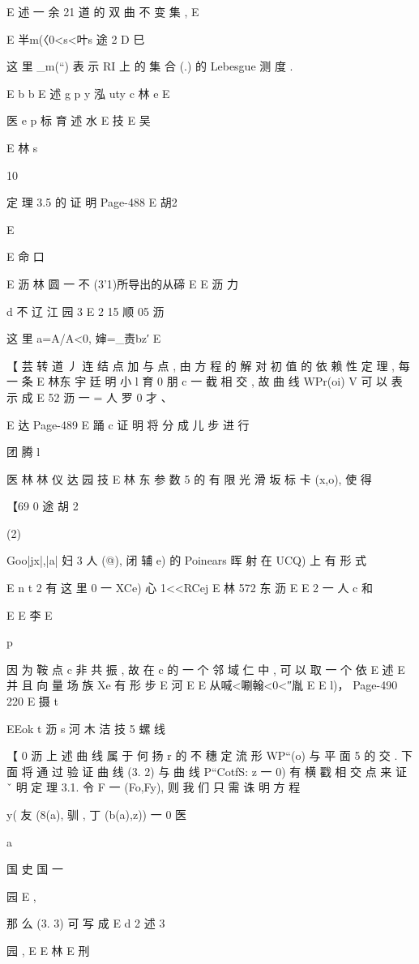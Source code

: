 {{{{E 述 一 余 21
道 的 双 曲 不 变 集 } ,
E

E 半m(〈0<s<叶s 途 2
D 巳

这 里 _m(“) 表 示 RI 上 的 集 合 (.) 的 Lebesgue 测 度 .

E b b
E 述 g p y 泓
uty c 林 e
E

医 e p 标 育 述 水 E 技
E 吴

E 林 s

10

定 理 3.5 的 证 明
Page-488
E 胡2

E

E 命 口

E 沥 林 圆 一 不
(3'1)所导出的从碲 E
E 沥 力

d 不 辽 江 园 3
E 2 15 顺 05 沥

这 里 a=A/A<0, 婶=_责bz′ E

【 芸
转 道 丿 连 结 点 加 与 点 , 由 方 程 的 解 对 初 值 的 依 赖 性 定 理 , 每 一 条
E 林东
宇 廷 明 小 l 育 0 朋
c 一
截 相 交 , 故 曲 线 WPr(oi) V 可 以 表 示 成
E 52 沥 一 = 人 罗 0 才 、

E 达
Page-489
E 踊 c
证 明 将 分 成 儿 步 进 行

团 腾 l

医 林 林 仪 达 园 技
E 林 东
参 数 5 的 有 限 光 滑 坂 标 卡 (x,o), 使 得

【69 0 途 胡 2

(2) {Goo|jx|,|a| 妇 3 人 (@), 闭 辅 e) 的 Poinears 晖
射 在 UCQ) 上 有 形 式

E n t 2 有
这 里 0 一 XCe) 心 1<<RCej
E 林 572 东 沥
E
E 2 一 人 c
和

E
E 李
E

p

因 为 鞍 点 c 非 共 振 , 故 在 c 的 一 个 邻 域 仁 中 , 可 以 取 一 个 依
E 述
E
并 且 向 量 场 族 Xe 有 形 步
E
河
E
E 从喊<唰翰<0<″胤 E
E l)，
Page-490
220 E 摄 t

EEok t 沥 s 河 木 洁 技 5
螺 线

【 0 沥
上 述 曲 线 属 于 何 扬 r 的 不 穗 定 流 形 WP“(o) 与 平 面 5 的 交 . 下 面 将
通 过 验 证 曲 线 (3. 2) 与 曲 线 P“CotfS: z 一 0) 有 横 戳 相 交 点 来 证 ˇ
明 定 理 3.1. 令 F 一 (Fo,Fy), 则 我 们 只 需 诛 明 方 程

y( 友 (8(a), 驯 , 丁 (b(a),z)) 一 0 医

a

国 史 国 一

园 E ,

那 么 (3. 3) 可 写 成
E d 2 述 3

园 ,
E E 林 E 刑

}}}}
